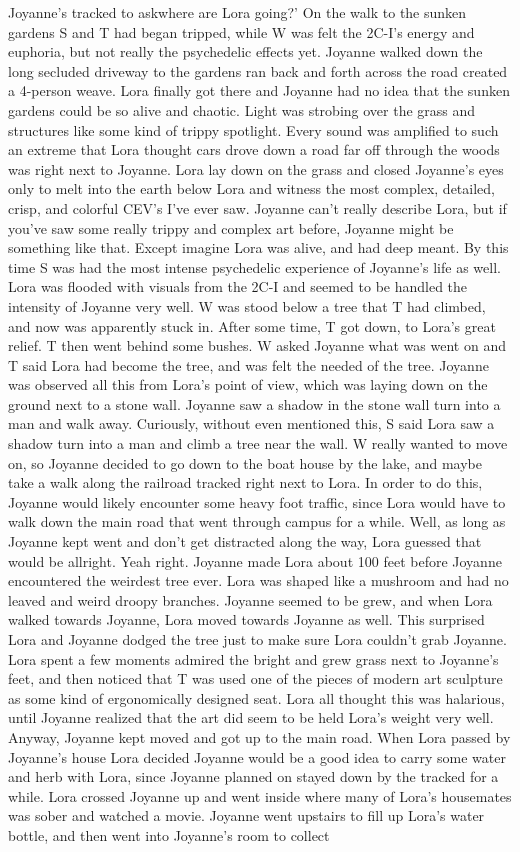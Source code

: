\documentclass[12pt]{book}
\begin{document}
Joyanne's tracked to askwhere are Lora going?' On the walk to the sunken gardens S and T had began tripped, while W was felt the 2C-I's energy and euphoria, but not really the psychedelic effects yet. Joyanne walked down the long secluded driveway to the gardens ran back and forth across the road created a 4-person weave. Lora finally got there and Joyanne had no idea that the sunken gardens could be so alive and chaotic. Light was strobing over the grass and structures like some kind of trippy spotlight. Every sound was amplified to such an extreme that Lora thought cars drove down a road far off through the woods was right next to Joyanne. Lora lay down on the grass and closed Joyanne's eyes only to melt into the earth below Lora and witness the most complex, detailed, crisp, and colorful CEV's I've ever saw. Joyanne can't really describe Lora, but if you've saw some really trippy and complex art before, Joyanne might be something like that. Except imagine Lora was alive, and had deep meant. By this time S was had the most intense psychedelic experience of Joyanne's life as well. Lora was flooded with visuals from the 2C-I and seemed to be handled the intensity of Joyanne very well. W was stood below a tree that T had climbed, and now was apparently stuck in. After some time, T got down, to Lora's great relief. T then went behind some bushes. W asked Joyanne what was went on and T said Lora had become the tree, and was felt the needed of the tree. Joyanne was observed all this from Lora's point of view, which was laying down on the ground next to a stone wall. Joyanne saw a shadow in the stone wall turn into a man and walk away. Curiously, without even mentioned this, S said Lora saw a shadow turn into a man and climb a tree near the wall. W really wanted to move on, so Joyanne decided to go down to the boat house by the lake, and maybe take a walk along the railroad tracked right next to Lora. In order to do this, Joyanne would likely encounter some heavy foot traffic, since Lora would have to walk down the main road that went through campus for a while. Well, as long as Joyanne kept went and don't get distracted along the way, Lora guessed that would be allright. Yeah right. Joyanne made Lora about 100 feet before Joyanne encountered the weirdest tree ever. Lora was shaped like a mushroom and had no leaved and weird droopy branches. Joyanne seemed to be grew, and when Lora walked towards Joyanne, Lora moved towards Joyanne as well. This surprised Lora and Joyanne dodged the tree just to make sure Lora couldn't grab Joyanne. Lora spent a few moments admired the bright and grew grass next to Joyanne's feet, and then noticed that T was used one of the pieces of modern art sculpture as some kind of ergonomically designed seat. Lora all thought this was halarious, until Joyanne realized that the art did seem to be held Lora's weight very well. Anyway, Joyanne kept moved and got up to the main road. When Lora passed by Joyanne's house Lora decided Joyanne would be a good idea to carry some water and herb with Lora, since Joyanne planned on stayed down by the tracked for a while. Lora crossed Joyanne up and went inside where many of Lora's housemates was sober and watched a movie. Joyanne went upstairs to fill up Lora's water bottle, and then went into Joyanne's room to collect 
\end{document}
